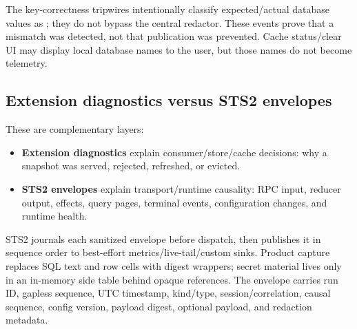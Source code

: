 \documentclass[11pt]{article}
\newcommand{\code}[1]{\texttt{\detokenize{#1}}}
\begin{document}
The key-correctness tripwires intentionally classify expected/actual database values as \code{source.path}; they do not bypass the central redactor. These events prove that a mismatch was detected, not that publication was prevented. Cache status/clear UI may display local database names to the user, but those names do not become telemetry.

\subsection{Extension diagnostics versus STS2 envelopes}

These are complementary layers:

\begin{itemize}
  \item \textbf{Extension diagnostics} explain consumer/store/cache decisions: why a snapshot was served, rejected, refreshed, or evicted.
  \item \textbf{STS2 envelopes} explain transport/runtime causality: RPC input, reducer output, effects, query pages, terminal events, configuration changes, and runtime health.
\end{itemize}

STS2 journals each sanitized envelope before dispatch, then publishes it in sequence order to best-effort metrics/live-tail/custom sinks. Product capture replaces SQL text and row cells with digest wrappers; secret material lives only in an in-memory side table behind opaque references. The envelope carries run ID, gapless sequence, UTC timestamp, kind/type, session/correlation, causal sequence, config version, payload digest, optional payload, and redaction metadata.
\end{document}
